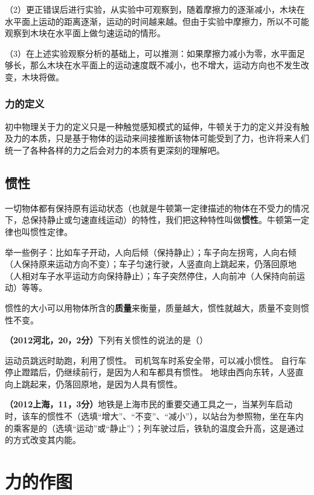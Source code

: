 \documentclass[12pt,twoside]{exam}
\begin{document}
\begin{knowledge}
（2）更正错误后进行实验，从实验中可观察到，随着摩擦力的逐渐减小，木块在水平面上运动的距离逐渐\answerline*[变长]，运动的时间越来越\answerline*[长]。但由于实验中摩擦力，所以不可能观察到木块在水平面上做匀速运动的情形。

（3）在上述实验观察分析的基础上，可以推测：如果摩擦力减小为零，水平面足够长，那么木块在水平面上的运动速度既不减小，也不增大，运动方向也不发生改变，木块将做。

\subsubsection{力的定义}
初中物理关于力的定义只是一种触觉感知模式的延伸，牛顿关于力的定义并没有触及力的本质，只是基于物体的运动来间接推断该物体可能受到了力，也许将来人们统一了各种各样的力之后会对力的本质有更深刻的理解吧。


\subsection{惯性}
一切物体都有保持原有运动状态（也就是牛顿第一定律描述的物体在不受力的情况下，总保持静止或匀速直线运动）的特性，我们把这种特性叫做\textbf{惯性}。牛顿第一定律也叫惯性定律。

举一些例子：比如车子开动，人向后倾（保持静止）；车子向左拐弯，人向右倾（人保持原来运动方向不变）；车子匀速行驶，人竖直向上跳起来，仍落回原地（人相对车子水平运动方向保持静止）；车子突然停住，人向前冲（人保持向前运动）等等。

惯性的大小可以用物体所含的\textbf{质量}来衡量，质量越大，惯性就越大，质量不变则惯性不变。

\textbf{（2012河北，20，2分）}下列有关惯性的说法的是（\answerline*[B]）
\begin{choices}
\choice 运动员跳远时助跑，利用了惯性。
\choice 司机驾车时系安全带，可以减小惯性。
\choice 自行车停止蹬踏后，仍继续前行，是因为人和车都具有惯性。
\choice 地球由西向东转，人竖直向上跳起来，仍落回原地，是因为人具有惯性。
\end{choices}

\textbf{（2012上海，11，3分）}地铁是上海市民的重要交通工具之一，当某列车启动时，该车的惯性不\answerline*[不变]（选填“增大”、“不变”、“减小”），以站台为参照物，坐在车内的乘客是\answerline*[运动]的（选填“运动”或“静止”）；列车驶过后，铁轨的温度会升高，这是通过\answerline*[做功]的方式改变其内能。


\section{力的作图}

\end{knowledge}
\end{document}
